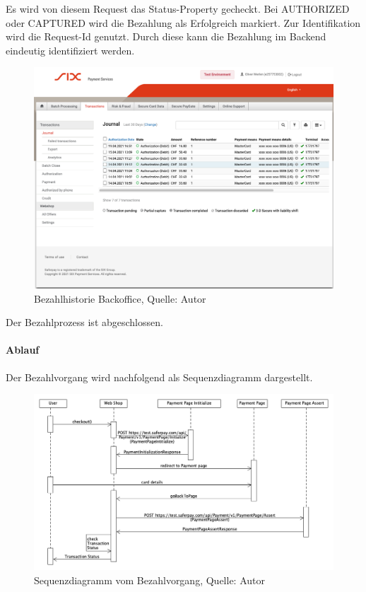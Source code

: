 Es wird von diesem Request das Status-Property gecheckt. Bei \glqq AUTHORIZED\grqq{} oder \glqq CAPTURED\grqq{} wird die Bezahlung als Erfolgreich markiert. 
Zur Identifikation wird die Request-Id genutzt. Durch diese kann die Bezahlung im Backend eindeutig identifiziert werden. 
\begin{figure}[H]
	\centering
	\includegraphics[width=1\textwidth]{images/paymentsBackoffice.PNG}
	\caption[Bezahlhistorie Backoffice]{Bezahlhistorie Backoffice, Quelle: Autor}
	\label{img: paymentsBackoffice}
\end{figure} 

Der Bezahlprozess ist abgeschlossen. 

\paragraph{Ablauf}
Der Bezahlvorgang wird nachfolgend als Sequenzdiagramm dargestellt.
\begin{figure}[H]
	\centering
	\includegraphics[width=1\textwidth]{images/paymentSequence.PNG}
	\caption[Sequenzdiagramm vom Bezahlvorgang]{Sequenzdiagramm vom Bezahlvorgang, Quelle: Autor}
	\label{img: paymentSequence}
\end{figure} 

